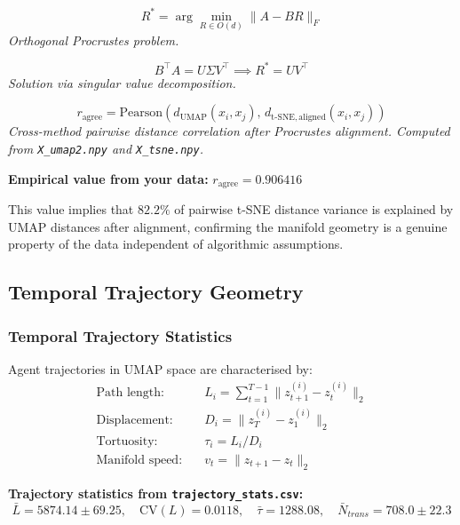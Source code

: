 \documentclass[12pt]{article}
\begin{document}
\begin{equation}
R^* = \arg\min_{R \in O(d)}\|A - BR\|_F
\end{equation}
\noindent\textit{Orthogonal Procrustes problem.}


\begin{equation}
B^\top A = U\Sigma V^\top \implies R^* = UV^\top
\end{equation}
\noindent\textit{Solution via singular value decomposition.}


\begin{equation}
r_{\mathrm{agree}} = \mathrm{Pearson}\!\left(d_{\mathrm{UMAP}}(x_i, x_j),\,d_{\mathrm{t\text{-}SNE,aligned}}(x_i, x_j)\right)
\end{equation}
\noindent\textit{Cross-method pairwise distance correlation after Procrustes alignment. Computed from \texttt{X\_umap2.npy} and \texttt{X\_tsne.npy}.}

\noindent\textbf{Empirical value from your data:} $r_{\mathrm{agree}} = 0.906416$


\noindent This value implies that $82.2\%$ of pairwise t-SNE distance variance is explained by UMAP distances after alignment, confirming the manifold geometry is a genuine property of the data independent of algorithmic assumptions.



\subsection{Temporal Trajectory Geometry}


\subsubsection{Temporal Trajectory Statistics}

Agent trajectories in UMAP space are characterised by:
\begin{align}
\text{Path length:}\quad & L_i = \sum_{t=1}^{T-1}
  \|z_{t+1}^{(i)} - z_t^{(i)}\|_2 \\
\text{Displacement:}\quad & D_i = \|z_T^{(i)} - z_1^{(i)}\|_2 \\
\text{Tortuosity:}\quad & \tau_i = L_i / D_i \\
\text{Manifold speed:}\quad &
  v_t = \|z_{t+1} - z_t\|_2
\end{align}

\noindent\textbf{Trajectory statistics from \texttt{trajectory\_stats.csv}:}
\begin{equation}
\bar{L} = 5874.14 \pm 69.25, \quad \mathrm{CV}(L) = 0.0118, \quad \bar{\tau} = 1288.08, \quad \bar{N}_{trans} = 708.0 \pm 22.3
\end{equation}
\end{document}
